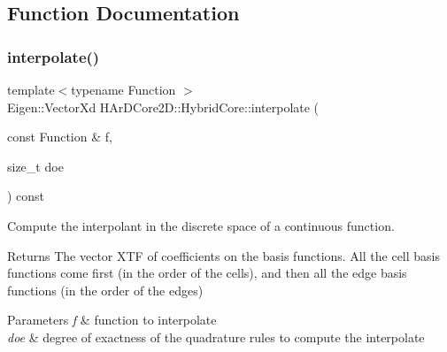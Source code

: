\subsection{Function Documentation}
\mbox{\label{group__HybridCore_ga71c953efc96f467cb24faa1b60ee9bb2}} 
\subsubsection{\texorpdfstring{interpolate()}{interpolate()}}
{\footnotesize\ttfamily template$<$typename Function $>$ \\
Eigen\+::\+Vector\+Xd H\+Ar\+D\+Core2\+D\+::\+Hybrid\+Core\+::interpolate (\begin{DoxyParamCaption}\item[{const Function \&}]{f,  }\item[{size\+\_\+t}]{doe }\end{DoxyParamCaption}) const}



Compute the interpolant in the discrete space of a continuous function. 

\begin{DoxyReturn}{Returns}
The vector X\+TF of coefficients on the basis functions. All the cell basis functions come first (in the order of the cells), and then all the edge basis functions (in the order of the edges) 
\end{DoxyReturn}

\begin{DoxyParams}{Parameters}
{\em f} & function to interpolate \\
\hline
{\em doe} & degree of exactness of the quadrature rules to compute the interpolate \\
\hline
\end{DoxyParams}
